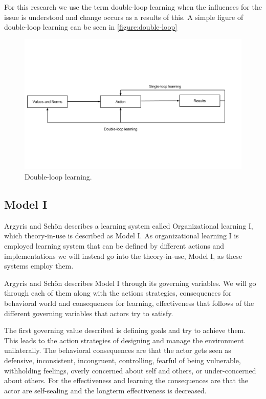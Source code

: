 For this research we use the term double-loop learning when the influences for the issue is understood and change occurs as a results of this. A simple figure of double-loop learning can be seen in \autoref{figure:double-loop}

\begin{figure}[!h]
	\centering
	\includegraphics[width=\textwidth, keepaspectratio]{figures/double-loop.png}
	\caption{Double-loop learning.}
	\label{figure:double-loop}
\end{figure}

\subsection{Model I} %
\label{sub:model_i}
Argyris and Schön \cite{Argyris1996} describes a learning system called Organizational learning I, which theory-in-use is described as Model I. As organizational learning I is employed learning system that can be defined by different actions and implementations we will instead go into the theory-in-use, Model I, as these systems employ them.

Argyris and Schön \cite{Argyris1996} describes Model I through its governing variables. We will go through each of them along with the actions strategies, consequences for behavioral world and consequences for learning, effectiveness that follows of the different governing variables that actors try to satisfy. 

The first governing value described is defining goals and try to achieve them. This leads to the action strategies of designing and manage the environment unilaterally. The behavioral consequences are that the actor gets seen as defensive, inconsistent, incongruent, controlling, fearful of being vulnerable, withholding feelings, overly concerned about self and others, or under-concerned about others. For the effectiveness and learning the consequences are that the actor are self-sealing and the longterm effectiveness is decreased. 

